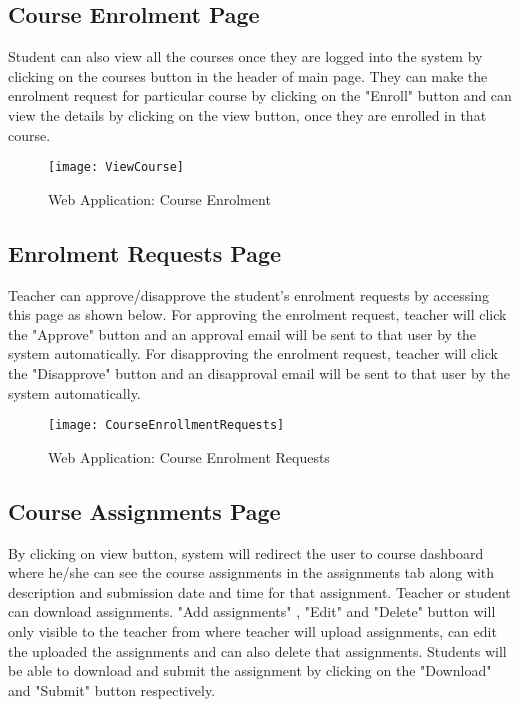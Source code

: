 \subsection{Course Enrolment Page}
Student can also view all the courses once they are logged into the system by clicking on the courses button in the header of main page. They can make the enrolment request for particular course by clicking on the "Enroll" button and can view the details by clicking on the view button, once they are enrolled in that course.

\begin{figure}[h]
  \centering
  \texttt{[image: ViewCourse]}
  \caption{Web Application: Course Enrolment}
\end{figure}

\subsection{Enrolment Requests Page}
Teacher can approve/disapprove the student's enrolment requests by accessing this page as shown below.  For approving the enrolment request, teacher will click the "Approve" button and an approval email will be sent to that user by the system automatically. For disapproving the enrolment request, teacher will click the "Disapprove" button and an disapproval email will be sent to that user by the system automatically.

\begin{figure}[h]
  \centering
  \texttt{[image: CourseEnrollmentRequests]}
  \caption{Web Application: Course Enrolment Requests}
\end{figure}

\subsection{Course Assignments Page}
By clicking on view button, system will redirect the user to course dashboard where he/she can see the course assignments in the assignments tab along with description and submission date and time for that assignment.  Teacher or student can download assignments. "Add assignments" , "Edit" and "Delete" button will only visible to the teacher from where teacher will upload assignments, can edit the uploaded the assignments and can also delete that assignments. Students will be able to download and submit the assignment by clicking on the "Download" and "Submit" button respectively. 

